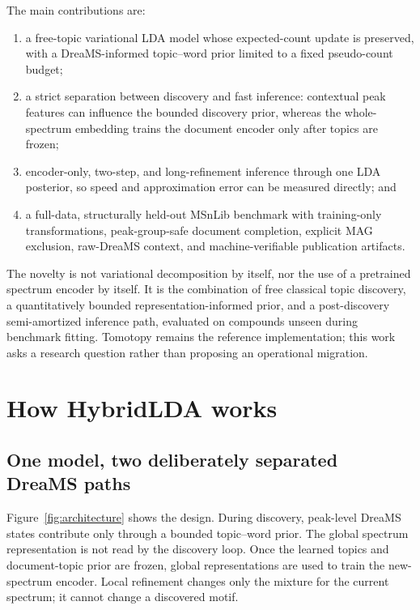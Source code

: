 \documentclass[11pt]{article}
\begin{document}
The main contributions are:
\begin{enumerate}
  \item a free-topic variational LDA model whose expected-count update is
        preserved, with a DreaMS-informed topic--word prior limited to a fixed
        pseudo-count budget;
  \item a strict separation between discovery and fast inference: contextual
        peak features can influence the bounded discovery prior, whereas the
        whole-spectrum embedding trains the document encoder only after topics
        are frozen;
  \item encoder-only, two-step, and long-refinement inference through one LDA
        posterior, so speed and approximation error can be measured directly;
        and
  \item a full-data, structurally held-out MSnLib benchmark with training-only
        transformations, peak-group-safe document completion, explicit MAG
        exclusion, raw-DreaMS context, and machine-verifiable publication
        artifacts.
\end{enumerate}

The novelty is not variational decomposition by itself, nor the use of a
pretrained spectrum encoder by itself. It is the combination of free classical
topic discovery, a quantitatively bounded representation-informed prior, and a
post-discovery semi-amortized inference path, evaluated on compounds unseen
during benchmark fitting. Tomotopy remains the reference implementation; this
work asks a research question rather than proposing an operational migration.

\section{How HybridLDA works}

\subsection{One model, two deliberately separated DreaMS paths}

Figure~\ref{fig:architecture} shows the design. During discovery, peak-level
DreaMS states contribute only through a bounded topic--word prior. The global
spectrum representation is not read by the discovery loop. Once the learned
topics and document-topic prior are frozen, global representations are used to
train the new-spectrum encoder. Local refinement changes only the mixture for
the current spectrum; it cannot change a discovered motif.
\end{document}
